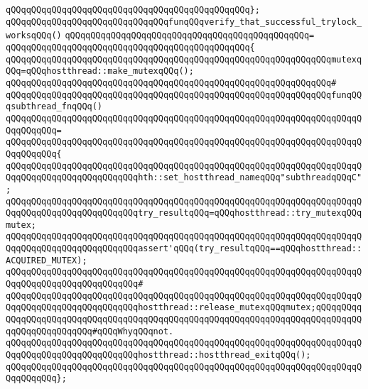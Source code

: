 \verb|qQQqqQQqqQQqqQQqqQQqqQQqqQQqqQQqqQQqqQQqqQQqqQQq};|\newline
\newline
\verb|qQQqqQQqqQQqqQQqqQQqqQQqqQQqqQQqfunqQQqverify_that_successful_trylock_worksqQQq()|\newline
\verb|qQQqqQQqqQQqqQQqqQQqqQQqqQQqqQQqqQQqqQQqqQQqqQQq=|\newline
\verb|qQQqqQQqqQQqqQQqqQQqqQQqqQQqqQQqqQQqqQQqqQQqqQQq{|\newline
\verb|qQQqqQQqqQQqqQQqqQQqqQQqqQQqqQQqqQQqqQQqqQQqqQQqqQQqqQQqqQQqqQQqmutexqQQq=qQQqhostthread::make_mutexqQQq();|\newline
\verb|qQQqqQQqqQQqqQQqqQQqqQQqqQQqqQQqqQQqqQQqqQQqqQQqqQQqqQQqqQQqqQQq#|\newline
\verb|qQQqqQQqqQQqqQQqqQQqqQQqqQQqqQQqqQQqqQQqqQQqqQQqqQQqqQQqqQQqqQQqfunqQQqsubthread_fnqQQq()|\newline
\verb|qQQqqQQqqQQqqQQqqQQqqQQqqQQqqQQqqQQqqQQqqQQqqQQqqQQqqQQqqQQqqQQqqQQqqQQqqQQqqQQq=|\newline
\verb|qQQqqQQqqQQqqQQqqQQqqQQqqQQqqQQqqQQqqQQqqQQqqQQqqQQqqQQqqQQqqQQqqQQqqQQqqQQqqQQq{|\newline
\verb|qQQqqQQqqQQqqQQqqQQqqQQqqQQqqQQqqQQqqQQqqQQqqQQqqQQqqQQqqQQqqQQqqQQqqQQqqQQqqQQqqQQqqQQqqQQqqQQqhth::set_hostthread_nameqQQq"subthreadqQQqC";|\newline
\newline
\verb|qQQqqQQqqQQqqQQqqQQqqQQqqQQqqQQqqQQqqQQqqQQqqQQqqQQqqQQqqQQqqQQqqQQqqQQqqQQqqQQqqQQqqQQqqQQqqQQqtry_resultqQQq=qQQqhostthread::try_mutexqQQqmutex;|\newline
\verb|qQQqqQQqqQQqqQQqqQQqqQQqqQQqqQQqqQQqqQQqqQQqqQQqqQQqqQQqqQQqqQQqqQQqqQQqqQQqqQQqqQQqqQQqqQQqqQQqassert'qQQq(try_resultqQQq==qQQqhostthread::ACQUIRED_MUTEX);|\newline
\verb|qQQqqQQqqQQqqQQqqQQqqQQqqQQqqQQqqQQqqQQqqQQqqQQqqQQqqQQqqQQqqQQqqQQqqQQqqQQqqQQqqQQqqQQqqQQqqQQq#|\newline
\verb|qQQqqQQqqQQqqQQqqQQqqQQqqQQqqQQqqQQqqQQqqQQqqQQqqQQqqQQqqQQqqQQqqQQqqQQqqQQqqQQqqQQqqQQqqQQqqQQqhostthread::release_mutexqQQqmutex;qQQqqQQqqQQqqQQqqQQqqQQqqQQqqQQqqQQqqQQqqQQqqQQqqQQqqQQqqQQqqQQqqQQqqQQqqQQqqQQqqQQqqQQqqQQqqQQq#qQQqWhyqQQqnot.|\newline
\newline
\verb|qQQqqQQqqQQqqQQqqQQqqQQqqQQqqQQqqQQqqQQqqQQqqQQqqQQqqQQqqQQqqQQqqQQqqQQqqQQqqQQqqQQqqQQqqQQqqQQqhostthread::hostthread_exitqQQq();|\newline
\verb|qQQqqQQqqQQqqQQqqQQqqQQqqQQqqQQqqQQqqQQqqQQqqQQqqQQqqQQqqQQqqQQqqQQqqQQqqQQqqQQq};|\newline
